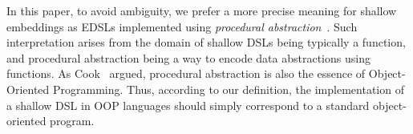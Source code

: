 \begin{comment}
For example, in their work
on EDSLs~\cite{}, Gibbons and Wu claim that deep embeddings (which
encode ASTs using algebraic datatypes in Haskell) allow adding new DSL
interpretations easily, but they make adding new language constructs
difficult. In contrast Gibbons and Wu claim that shallow embeddings
have dual modularity properties: new cases are easy to add, but new
interpretations are hard.  However what if, instead of using Haskell
and algebraic datatypes, one uses an OO language to encode an AST, for
example with the {\sc Composite} pattern.  Would this OO approach be
classified as a shallow or deep embedding? We believe arguments can be
made both ways. Since the {\sc Composite}
pattern is normally accepted to be a way to encode ASTs, it would be
reasonable to say that \emph{according to definition of deep embedding
  above, the OO approach classifies as a deep
  embedding}. Unfortunatelly this interpretation could be problematic.
As the Expression Problem~\cite{} tell us,
in the OO approach adding new language constructs is easy, but adding
interpretations is hard. Thus this would contradict Gibbons and Wu's
claims, since we have an AST representation (i.e. a deep embedding)
with the modularity properties of shallow embeddings.

We believe that the core of problem is that ASTs can be represented in
multiple ways. In particular, it is well know that functions alone are
enough to encode datastructures such as ASTs (via Church
encodings~\cite{}).  Distinguishing deep and shallow embeddings based
solely on whether a ``real'' datastructure is being used or not is
misleading.  Moreover, it gives the impression that shallow embeddings
are significantly less expressive than deep embeddings, because they
do not have access to the datastructure.
Gibbons and Wu themselves feel uneasy with the definition of shallow 
embeddings when they say:
``\emph{So it turns out that the syntax of the DSL is not really as ephemeral
in a shallow embedding as Boulton's choice of terms suggests.}''
\end{comment}

In this paper, to avoid ambiguity, we prefer a more precise meaning
for shallow embeddings as EDSLs implemented using \emph{procedural abstraction}~\cite{reynolds94proceduralabstraction}. Such
interpretation arises from the domain of shallow DSLs being
typically a function, and procedural abstraction being a way to encode
data abstractions using functions. As Cook~\cite{cook09abstraction} argued,
procedural abstraction is also the essence of Object-Oriented
Programming. Thus, according to our definition, the implementation of a shallow
DSL in OOP languages should simply correspond to a standard
object-oriented program.

